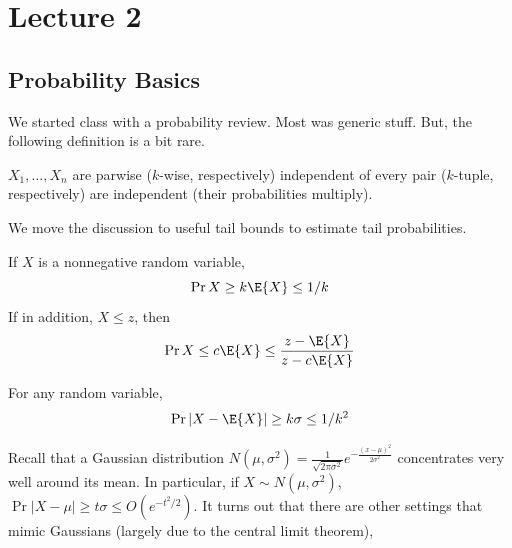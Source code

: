\section{Lecture 2}
\subsection{Probability Basics}
We started class with a probability review. Most
was generic stuff. But, the following definition is a bit rare.
\begin{definition}
    $X_1, \dots, X_n$ are parwise ($k$-wise, respectively)
    independent of every pair ($k$-tuple, respectively) are independent (their probabilities multiply).
\end{definition}
We move the discussion to useful tail bounds to estimate tail probabilities.
\begin{theorem}
    If $X$ is a nonnegative random variable,
    \[ \Pr{X \ge k \E{X}} \le 1/k \]
    If in addition, $X \le z$, then
    \[ \Pr{X \le c \E{X}} \le \frac{z - \E{X}}{z - c\E{X}} \]
\end{theorem}
\begin{theorem}
    For any random variable,
    \[ \Pr{|X - \E{X}| \ge k \sigma} \le 1/k^2 \]
\end{theorem}
Recall that a Gaussian distribution $N(\mu, \sigma^2) = \frac{1}{\sqrt{2\pi\sigma^2}} e^{-\frac{(x - \mu)^2}{2 \sigma^2}}$
concentrates very well around its mean. In particular,
if $X \sim N(\mu, \sigma^2)$, $\Pr{|X - \mu| \ge t\sigma} \le O(e^{-t^2/2})$.
It turns out that there are other settings that mimic Gaussians (largely due to the central limit theorem),
